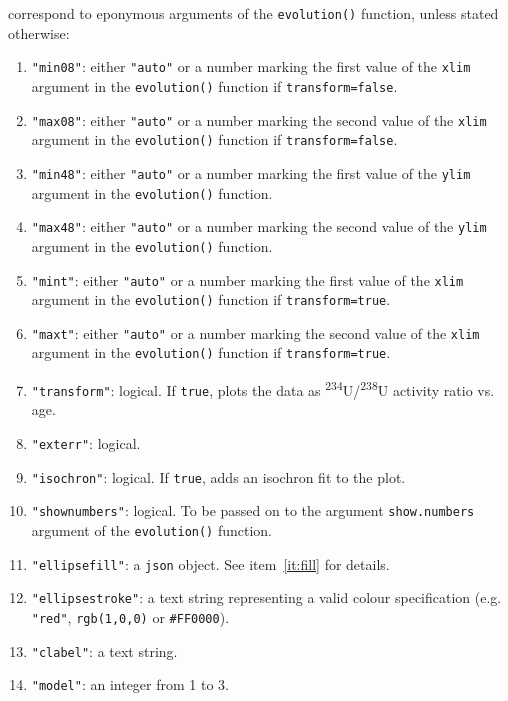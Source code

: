 \begin{refsection}
\begin{enumerate}[leftmargin=\parindent,align=left,
      labelwidth=\parindent,label*=2.\arabic*.]
  correspond to eponymous arguments of the \texttt{evolution()}
  function, unless stated otherwise:
  \begin{enumerate}[leftmargin=\parindent,align=left,
      labelwidth=\parindent,label*=\arabic*.]
  \item{\tt "min08"}: either \texttt{"auto"} or a number marking the
    first value of the \texttt{xlim} argument in the
    \texttt{evolution()} function if \texttt{transform=false}.
  \item{\tt "max08"}: either \texttt{"auto"} or a number marking the
    second value of the \texttt{xlim} argument in the
    \texttt{evolution()} function if \texttt{transform=false}.
  \item{\tt "min48"}: either \texttt{"auto"} or a number marking the
    first value of the \texttt{ylim} argument in the
    \texttt{evolution()} function.
  \item{\tt "max48"}: either \texttt{"auto"} or a number marking the
    second value of the \texttt{ylim} argument in the
    \texttt{evolution()} function.
  \item{\tt "mint"}: either \texttt{"auto"} or a number marking the
    first value of the \texttt{xlim} argument in the
    \texttt{evolution()} function if \texttt{transform=true}.
  \item{\tt "maxt"}: either \texttt{"auto"} or a number marking the
    second value of the \texttt{xlim} argument in the
    \texttt{evolution()} function if \texttt{transform=true}.
  \item{\tt "transform"}: logical. If \texttt{true}, plots the data as
    \textsuperscript{234}U/\textsuperscript{238}U activity ratio
    vs. age.
  \item{\tt "exterr"}: logical.
  \item{\tt "isochron"}: logical. If \texttt{true}, adds an isochron
    fit to the plot.
  \item{\tt "shownumbers"}: logical. To be passed on to the argument
    \texttt{show.numbers} argument of the \texttt{evolution()}
    function.
  \item{\tt "ellipsefill"}: a \texttt{json} object. See
    item~\ref{it:fill} for details.
  \item{\tt "ellipsestroke"}: a text string representing a valid
    colour specification (e.g. \texttt{"red"}, \texttt{rgb(1,0,0)} or
    \texttt{\#FF0000}).
  \item{\tt "clabel"}: a text string.
  \item{\tt "model"}: an integer from 1 to 3.

\end{enumerate}
\end{enumerate}
\end{refsection}
